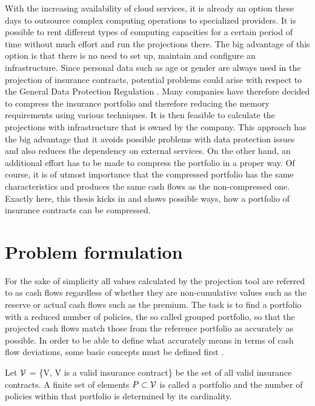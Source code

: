 With the increasing availability of cloud services, it is already an option these days to outsource complex computing operations to specialized providers. It is possible to rent different types of computing capacities for a certain period of time without much effort and run the projections there. The big advantage of this option is that there is no need to set up, maintain and configure an infrastructure. Since personal data such as age or gender are always used in the projection of insurance contracts, potential problems could arise with respect to the General Data Protection Regulation \cite{datenschutz}. Many companies have therefore decided to compress the insurance portfolio and therefore reducing the memory requirements using various techniques. It is then feasible to calculate the projections with infrastructure that is owned by the company. This approach has the big advantage that it avoids possible problems with data protection issues and also reduces the dependency on external services. On the other hand, an additional effort has to be made to compress the portfolio in a proper way. Of course, it is of utmost importance that the compressed portfolio has the same characteristics and produces the same cash flows as the non-compressed one. Exactly here, this thesis kicks in and shows possible ways, how a portfolio of insurance contracts can be compressed. 

\section{Problem formulation}
For the sake of simplicity all values calculated by the projection tool are referred to as cash flows regardless of whether they are non-cumulative values such as the reserve or actual cash flows such as the premium. The task is to find a portfolio with a reduced number of policies, the so called grouped portfolio, so that the projected cash flows match those from the reference  portfolio as accurately as possible. In order to be able to define what accurately means in terms of cash flow deviations, some basic concepts must be defined first . 

\begin{definition}
	Let $\mathcal{V}$ = \{V, V is a valid insurance contract\} be the set of all valid insurance contracts. A finite set of elements $P \subset \mathcal{V}$ is called a portfolio and the number of policies within that portfolio is determined by its cardinality.
\end{definition}

